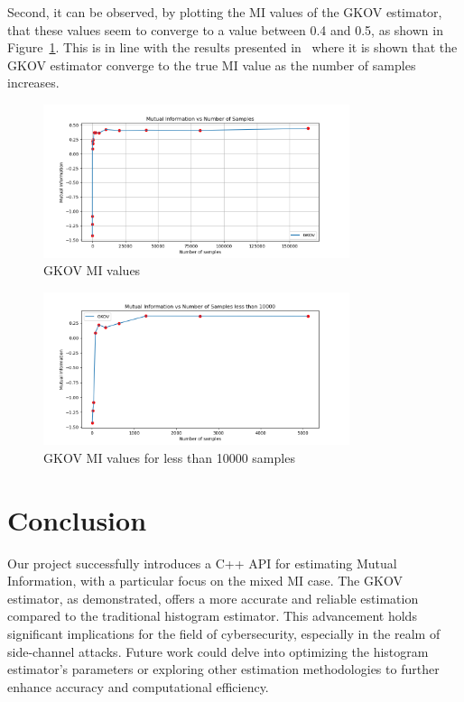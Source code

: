 \documentclass[12pt]{article}
\begin{document}
    Second, it can be observed, by plotting the MI values of the GKOV estimator, that these values seem to converge to a value between 0.4 and 0.5, as shown in Figure~\ref{fig:gkov_mi}.
    This is in line with the results presented in~\cite{chowdhury_leakage_2022} where it is shown that the GKOV estimator converge to the true MI value as the number of samples increases.

    \begin{figure}[H]
        \centering
        \includegraphics[width=0.8\textwidth]{../data/plots/gkov_mi}
        \caption{GKOV MI values}
        \label{fig:gkov_mi}
    \end{figure}

    \begin{figure}[H]
        \centering
        \includegraphics[width=0.8\textwidth]{../data/plots/gkov_mi_10000}
        \caption{GKOV MI values for less than 10000 samples}
        \label{fig:gkov_mi_10000}
    \end{figure}

    \section{Conclusion}
    Our project successfully introduces a C++ API for estimating Mutual Information, with a particular focus on the mixed MI case.
    The GKOV estimator, as demonstrated, offers a more accurate and reliable estimation compared to the traditional histogram estimator.
    This advancement holds significant implications for the field of cybersecurity, especially in the realm of side-channel attacks.
    Future work could delve into optimizing the histogram estimator's parameters or exploring other estimation methodologies to further enhance accuracy and computational efficiency.

    \newpage
    
    
\end{document}
